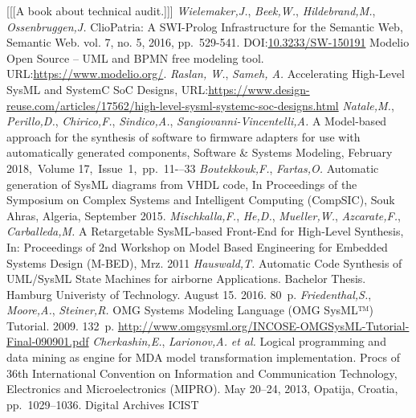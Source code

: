 \documentclass[12pt,a4paper]{llncs}
\begin{document}
\begin{thebibliography}{99}
 [[[A book about technical audit.]]]
 \emph{Wielemaker,J.}, \emph{Beek,W.}, \emph{Hildebrand,M.}, \emph{Ossenbruggen,J.} ClioPatria: A SWI-Prolog Infrastructure for the Semantic Web, Semantic Web. vol. 7, no. 5, 2016, pp.~529-541. DOI:\url{10.3233/SW-150191}
 Modelio Open Source -- UML and BPMN free modeling tool. URL:\url{https://www.modelio.org/}.
 \emph{Raslan, W.}, \emph{Sameh, A.} Accelerating High-Level SysML and SystemC SoC Designs, URL:\url{https://www.design-reuse.com/articles/17562/high-level-sysml-systemc-soc-designs.html}
 \emph{Natale,M.}, \emph{Perillo,D.}, \emph{Chirico,F.}, \emph{Sindico,A.}, \emph{Sangiovanni-Vincentelli,A.} A Model-based approach for the synthesis of software to firmware adapters for use with automatically generated components, Software \& Systems Modeling, February 2018,~Volume 17,~Issue~1,~pp.~11-–33
 \emph{Boutekkouk,F.}, \emph{Fartas,O.} Automatic generation of SysML diagrams from VHDL code, In Proceedings of the Symposium on Complex Systems and Intelligent Computing (CompSIC), Souk Ahras, Algeria, September 2015.
 \emph{Mischkalla,F.}, \emph{He,D.}, \emph{Mueller,W.}, \emph{Azcarate,F.}, \emph{Carballeda,M.} A Retargetable SysML-based Front-End for High-Level Synthesis, In: Proceedings of 2nd Workshop on Model Based Engineering for Embedded Systems Design (M-BED), Mrz. 2011
 \emph{Hauswald,T.} Automatic Code Synthesis of UML/SysML State Machines for airborne Applications.  Bachelor Thesis. Hamburg Univeristy of Technology. August 15. 2016. 80~p.
 \emph{Friedenthal,S.}, \emph{Moore,A.}, \emph{Steiner,R.} OMG Systems Modeling Language (OMG SysML™) Tutorial. 2009. 132~p. \url{http://www.omgsysml.org/INCOSE-OMGSysML-Tutorial-Final-090901.pdf}
 \emph{Cherkashin,E.}, \emph{Larionov,A.} \emph{et al.} Logical programming and data mining as engine for MDA model transformation implementation. Procs of 36th International Convention on Information and Communication Technology, Electronics and Microelectronics (MIPRO). May 20--24, 2013, Opatija, Croatia, pp.~1029--1036.
 Digital Archives
 ICIST
\end{thebibliography}
\end{document}
